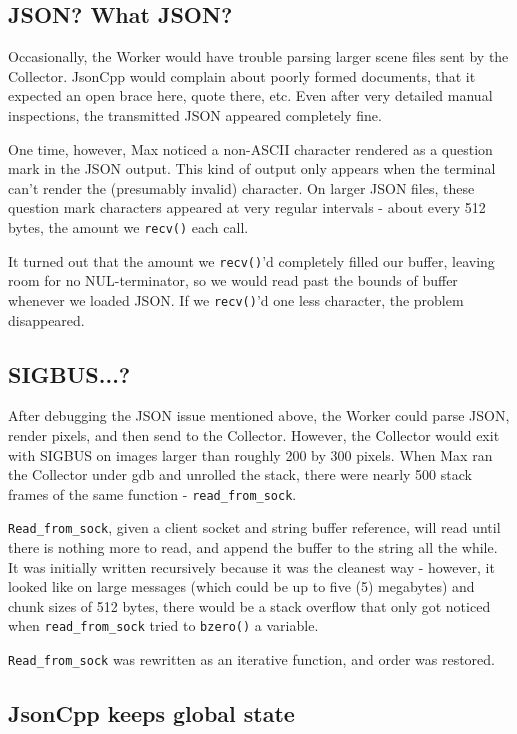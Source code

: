 \documentclass[letterpaper,twocolumn,10pt]{article}
\begin{document}
\subsection{JSON? What JSON?}

Occasionally, the Worker would have trouble parsing larger scene files sent by
the Collector. JsonCpp would complain about poorly formed documents, that it
expected an open brace here, quote there, etc. Even after very detailed manual
inspections, the transmitted JSON appeared completely fine.

One time, however, Max noticed a non-ASCII character rendered as a question mark
in the JSON output. This kind of output only appears when the terminal can't
render the (presumably invalid) character. On larger JSON files, these question
mark characters appeared at very regular intervals - about every 512 bytes, the
amount we \verb|recv()| each call.

It turned out that the amount we \verb|recv()|'d completely filled our buffer,
leaving room for no NUL-terminator, so we would read past the bounds of buffer
whenever we loaded JSON. If we \verb|recv()|'d one less character, the problem
disappeared.

\subsection{SIGBUS...?}

After debugging the JSON issue mentioned above, the Worker could parse JSON,
render pixels, and then send to the Collector. However, the Collector would exit
with SIGBUS on images larger than roughly 200 by 300 pixels. When Max ran the
Collector under gdb and unrolled the stack, there were nearly 500 stack frames
of the same function - \verb|read_from_sock|.

\verb|Read_from_sock|, given a client socket and string buffer reference, will
read until there is nothing more to read, and append the buffer to the string
all the while. It was initially written recursively because it was the cleanest
way - however, it looked like on large messages (which could be up to five (5)
megabytes) and chunk sizes of 512 bytes, there would be a stack overflow that
only got noticed when \verb|read_from_sock| tried to \verb|bzero()| a variable.

\verb|Read_from_sock| was rewritten as an iterative function, and order was
restored.

\subsection{JsonCpp keeps global state}
\end{document}
